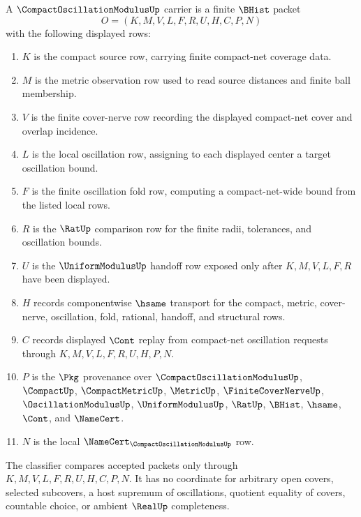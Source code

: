 \begin{definition}
\label{def:compact-oscillation-modulus-carrier}
A $\CompactOscillationModulusUp$ carrier is a finite $\BHist$ packet
$$
O=(K,M,V,L,F,R,U,H,C,P,N)
$$
with the following displayed rows:
\begin{enumerate}
\item $K$ is the compact source row, carrying finite compact-net coverage data.
\item $M$ is the metric observation row used to read source distances and finite ball membership.
\item $V$ is the finite cover-nerve row recording the displayed compact-net cover and overlap incidence.
\item $L$ is the local oscillation row, assigning to each displayed center a target oscillation bound.
\item $F$ is the finite oscillation fold row, computing a compact-net-wide bound from the listed local rows.
\item $R$ is the $\RatUp$ comparison row for the finite radii, tolerances, and oscillation bounds.
\item $U$ is the $\UniformModulusUp$ handoff row exposed only after $K,M,V,L,F,R$ have been displayed.
\item $H$ records componentwise $\hsame$ transport for the compact, metric, cover-nerve, oscillation, fold, rational, handoff, and structural rows.
\item $C$ records displayed $\Cont$ replay from compact-net oscillation requests through $K,M,V,L,F,R,U,H,P,N$.
\item $P$ is the $\Pkg$ provenance over $\CompactOscillationModulusUp$, $\CompactUp$, $\CompactMetricUp$, $\MetricUp$, $\FiniteCoverNerveUp$, $\OscillationModulusUp$, $\UniformModulusUp$, $\RatUp$, $\BHist$, $\hsame$, $\Cont$, and $\NameCert$.
\item $N$ is the local $\NameCert_{\CompactOscillationModulusUp}$ row.
\end{enumerate}
The classifier compares accepted packets only through $K,M,V,L,F,R,U,H,C,P,N$. It has no coordinate for arbitrary open covers, selected subcovers, a host supremum of oscillations, quotient equality of covers, countable choice, or ambient $\RealUp$ completeness.
\end{definition}

